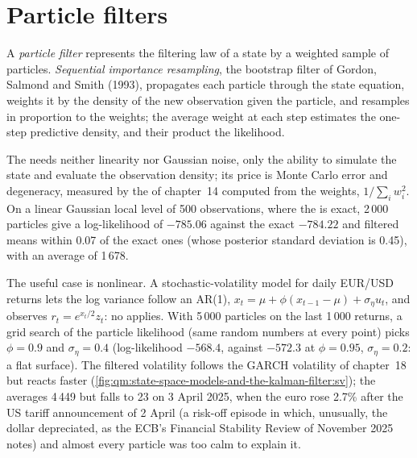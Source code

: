 \section{Particle filters}

\begin{definition}\label{def:qm:state-space-models-and-the-kalman-filter:pf}
A \emph{particle filter} represents the filtering law of a state by a weighted sample of particles. \emph{Sequential importance
resampling}, the bootstrap filter of Gordon, Salmond and Smith (1993), propagates each particle through the state
equation, weights it by the density of the new observation given the particle, and resamples in proportion to the weights; the average weight at each step
estimates the one-step predictive density, and their product the likelihood.
\end{definition}

The  needs neither linearity nor Gaussian noise, only the ability to simulate the state and evaluate the observation density; its price is
Monte Carlo error and degeneracy, measured by the  of chapter~14 computed from the weights, $1/\sum_iw_i^2$. On a linear Gaussian
local level of 500 observations, where the  is exact, 2\,000 particles give a log-likelihood of $-785.06$ against the exact $-784.22$ and filtered
means within 0.07 of the exact ones (whose posterior standard deviation is 0.45), with an average  of 1\,678.

The useful case is nonlinear. A stochastic-volatility model for daily EUR/USD returns lets the log variance follow an AR(1), $x_t = \mu + \phi(x_{t-1} - \mu)
+ \sigma_\eta u_t$, and observes $r_t = e^{x_t/2}z_t$: no  applies. With 5\,000 particles on the last 1\,000 returns, a grid search of the particle
likelihood (same random numbers at every point) picks $\phi = 0.9$ and $\sigma_\eta = 0.4$ (log-likelihood $-568.4$, against $-572.3$ at $\phi = 0.95$,
$\sigma_\eta = 0.2$: a flat surface). The filtered volatility follows the GARCH volatility of chapter~18 but reacts faster
(\cref{fig:qm:state-space-models-and-the-kalman-filter:sv}); the  averages 4\,449 but falls to 23 on 3 April 2025, when the euro rose 2.7\%
after the US tariff announcement of 2 April (a risk-off episode in which, unusually, the dollar depreciated, as the ECB's Financial Stability Review of November 2025
notes) and almost every particle was too calm to explain it.

